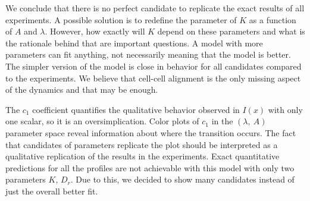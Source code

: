
We conclude that there is no perfect candidate to replicate the exact results of all experiments. A possible solution is to redefine the parameter of $K$ as a function of $A$ and $\lambda$. However, how exactly will $K$ depend on these parameters and what is the rationale behind that are important questions. A model with more parameters can fit anything, not necessarily meaning that the model is better. The simpler version of the model is close in behavior for all candidates compared to the experiments. We believe that cell-cell alignment is the only missing aspect of the dynamics and that may be enough. 

The $c_1$ coefficient quantifies the qualitative behavior observed in $I(x)$ with only one scalar, so it is an oversimplication. Color plots of $c_1$ in the $(\lambda, \ A)$ parameter space reveal information about where the transition occurs. The fact that candidates of parameters replicate the plot should be interpreted as a qualitative replication of the results in the experiments. Exact quantitative predictions for all the profiles are not achievable with this model with only two parameters $K$, $D_r$. Due to this, we decided to show many candidates instead of just the overall better fit.

